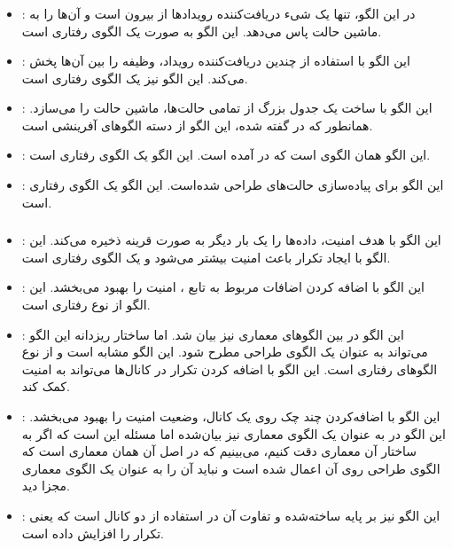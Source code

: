 \subsubsection{}
\begin{itemize}
\item {}: %
در این الگو، تنها یک شیء دریافت‌کننده رویدادها از بیرون است و آن‌ها را
به ماشین حالت پاس می‌دهد. این الگو به صورت یک الگوی رفتاری است.
\item {}: %
این الگو با استفاده از چندین دریافت‌کننده رویداد، وظیفه را بین آن‌ها پخش
می‌کند. این الگو نیز یک الگوی رفتاری است.
\item {}: %
این الگو با ساخت یک جدول بزرگ از تمامی حالت‌ها، ماشین حالت را می‌سازد.
همانطور که در \cite{ref4} گفته شده، این الگو از دسته الگوهای آفرینشی است.
\item {}: %
این الگو همان الگوی  است که در \cite{ref3} آمده
است. این الگو یک الگوی رفتاری است.
\item {}: %
این الگو برای پیاده‌سازی حالت‌های  طراحی شده‌است.
این الگو یک الگوی رفتاری است.
\end{itemize}


\subsubsection{}
\begin{itemize}
    \item {}: %
    این الگو با هدف امنیت، داده‌ها را یک بار دیگر به صورت قرینه ذخیره
    می‌کند. این الگو با ایجاد تکرار باعث امنیت بیشتر می‌شود و یک
    الگوی رفتاری است.
    \item {}: %
    این الگو با اضافه کردن اضافات مربوط به تابع ،
    امنیت را بهبود می‌بخشد. این الگو از نوع رفتاری است.
    \item {}: %
    این الگو در بین الگوهای معماری نیز بیان شد. اما ساختار ریزدانه این
    الگو می‌تواند به عنوان یک الگوی طراحی مطرح شود. این الگو مشابه
     \cite{ref3}
    است و از نوع الگوهای رفتاری است. این الگو با اضافه کردن تکرار
    در کانال‌ها می‌تواند به امنیت کمک کند.
    \item {}: %
    این الگو با اضافه‌کردن چند چک روی یک کانال، وضعیت امنیت را بهبود
    می‌بخشد. این الگو در \cite{ref4} به عنوان یک الگوی معماری نیز بیان‌شده
    اما مسئله این است که اگر به ساختار آن معماری دقت کنیم، می‌بینیم که در اصل
    آن همان معماری  است که الگوی
    طراحی  روی آن اعمال
    شده است و نباید آن را به عنوان یک الگوی معماری مجزا دید.
    \item {}: %
    این الگو نیز بر پایه  ساخته‌شده و تفاوت آن در
    استفاده از دو کانال است که یعنی تکرار را افزایش داده است.
\end{itemize}

